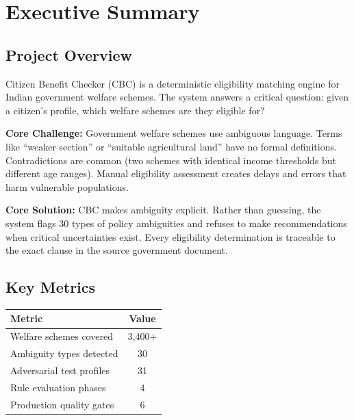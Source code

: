 \documentclass[11pt,a4paper]{report}
\newcommand{\tabhead}[1]{\textbf{\color{primary}#1}}
\begin{document}
\chapter{Executive Summary}

\section{Project Overview}

Citizen Benefit Checker (CBC) is a deterministic eligibility matching engine for Indian government welfare schemes. The system answers a critical question: given a citizen's profile, which welfare schemes are they eligible for?

\textbf{Core Challenge:} Government welfare schemes use ambiguous language. Terms like ``weaker section'' or ``suitable agricultural land'' have no formal definitions. Contradictions are common (two schemes with identical income thresholds but different age ranges). Manual eligibility assessment creates delays and errors that harm vulnerable populations.

\textbf{Core Solution:} CBC makes ambiguity explicit. Rather than guessing, the system flags 30 types of policy ambiguities and refuses to make recommendations when critical uncertainties exist. Every eligibility determination is traceable to the exact clause in the source government document.

\section{Key Metrics}

\begin{table}[H]
\centering
\begin{tabular}{lc}
\toprule
\tabhead{Metric} & \tabhead{Value} \\
\midrule
Welfare schemes covered & 3,400+ \\
Ambiguity types detected & 30 \\
Adversarial test profiles & 31 \\
Rule evaluation phases & 4 \\
Production quality gates & 6 \\
\bottomrule
\end{tabular}
\end{table}
\end{document}

